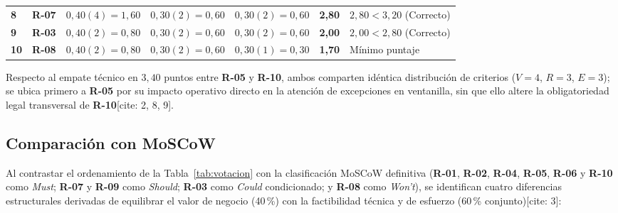 \documentclass[12pt,a4paper]{article}
\begin{document}
\begin{longtable}{
    C{1.2cm}
    C{1.2cm}
    C{2.1cm}
    C{2.1cm}
    C{2.1cm}
    C{1.6cm}
    C{3.3cm}
}
\textbf{8} & \textbf{R-07} & $0{,}40(4) = 1{,}60$ & $0{,}30(2) = 0{,}60$ & $0{,}30(2) = 0{,}60$ & \textbf{2{,}80} & $2{,}80 < 3{,}20$ (Correcto) \\

\textbf{9} & \textbf{R-03} & $0{,}40(2) = 0{,}80$ & $0{,}30(2) = 0{,}60$ & $0{,}30(2) = 0{,}60$ & \textbf{2{,}00} & $2{,}00 < 2{,}80$ (Correcto) \\

\textbf{10} & \textbf{R-08} & $0{,}40(2) = 0{,}80$ & $0{,}30(2) = 0{,}60$ & $0{,}30(1) = 0{,}30$ & \textbf{1{,}70} & Mínimo puntaje \\

\end{longtable}

\endgroup

Respecto al empate técnico en $3{,}40$ puntos entre \textbf{R-05} y \textbf{R-10}, ambos comparten idéntica distribución de criterios ($V=4$, $R=3$, $E=3$); se ubica primero a \textbf{R-05} por su impacto operativo directo en la atención de excepciones en ventanilla, sin que ello altere la obligatoriedad legal transversal de \textbf{R-10}[cite: 2, 8, 9].

\subsection{Comparación con MoSCoW}

Al contrastar el ordenamiento de la Tabla~\ref{tab:votacion} con la clasificación MoSCoW definitiva (\textbf{R-01}, \textbf{R-02}, \textbf{R-04}, \textbf{R-05}, \textbf{R-06} y \textbf{R-10} como \textit{Must}; \textbf{R-07} y \textbf{R-09} como \textit{Should}; \textbf{R-03} como \textit{Could} condicionado; y \textbf{R-08} como \textit{Won't}), se identifican cuatro diferencias estructurales derivadas de equilibrar el valor de negocio (40\,\%) con la factibilidad técnica y de esfuerzo (60\,\% conjunto)[cite: 3]:
\end{document}
